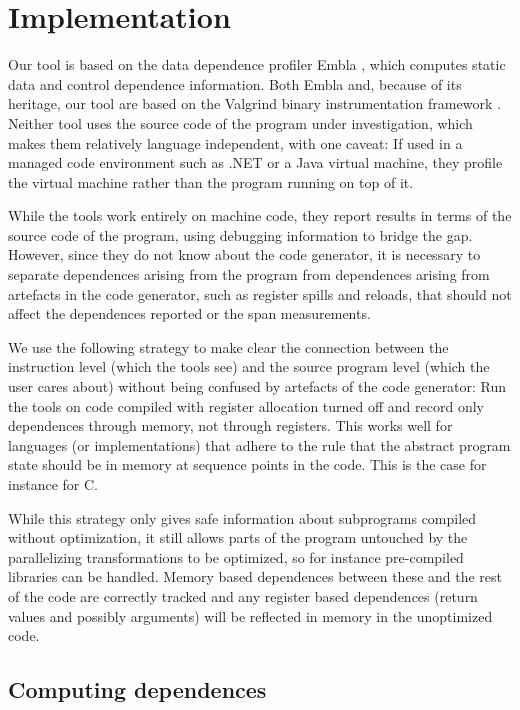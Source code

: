 \section{Implementation}

Our tool is based on the data dependence profiler Embla \cite{embla:08},
which computes static data and control dependence information.  Both Embla
and, because of its heritage, our tool are based on the Valgrind binary
instrumentation framework \cite{valgrind:07}. Neither tool uses the 
source code of the program under investigation, which makes them 
relatively language independent, with one caveat: If used in a managed
code environment such as .NET or a Java virtual machine, they profile the
virtual machine rather than the program running on top of it.

While the tools work entirely on machine code, they report results in terms 
of the source code of the program, using debugging information to bridge
the gap. However, since they do not know about the code generator, it is 
necessary to separate dependences arising from the program from 
dependences arising from artefacts in the code generator, such as 
register spills and reloads, that should not affect the dependences 
reported or the span measurements. 

We use the following strategy to make clear the connection between the 
instruction level (which the tools see) and the source program level 
(which the user cares about) without being confused by artefacts of 
the code generator:
Run the tools on code compiled with register allocation turned off and 
record only dependences through memory, not through registers.
This works well for languages 
(or implementations) that adhere to the rule that the abstract program 
state should be in memory at sequence points in the code. This is the 
case for instance for C. 

While this strategy only gives safe information about subprograms compiled 
without optimization, it still allows parts of the program untouched by the 
parallelizing transformations to be optimized, so for instance pre-compiled 
libraries can be handled. Memory based dependences between these and the 
rest of the code are correctly tracked 
and any register based dependences (return values and possibly arguments)
will be reflected in memory in the
unoptimized code.


\subsection{Computing dependences}   \label{snca}

